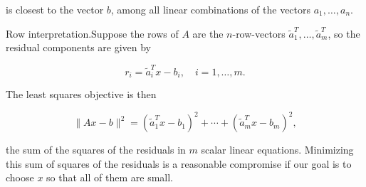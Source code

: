 is closest to the vector \(b\), among all linear combinations of the vectors \(a_{1},\ldots,a_{n}\).

Row interpretation.Suppose the rows of \(A\) are the \(n\)-row-vectors \(\tilde{a}_{1}^{T},\ldots,\tilde{a}_{m}^{T}\), so the residual components are given by

\[r_{i}=\tilde{a}_{i}^{T}x-b_{i},\quad i=1,\ldots,m.\]

The least squares objective is then

\[\|Ax-b\|^{2}=(\tilde{a}_{1}^{T}x-b_{1})^{2}+\cdots+(\tilde{a}_{m}^{T}x-b_{m}) ^{2},\]

the sum of the squares of the residuals in \(m\) scalar linear equations. Minimizing this sum of squares of the residuals is a reasonable compromise if our goal is to choose \(x\) so that all of them are small.

 